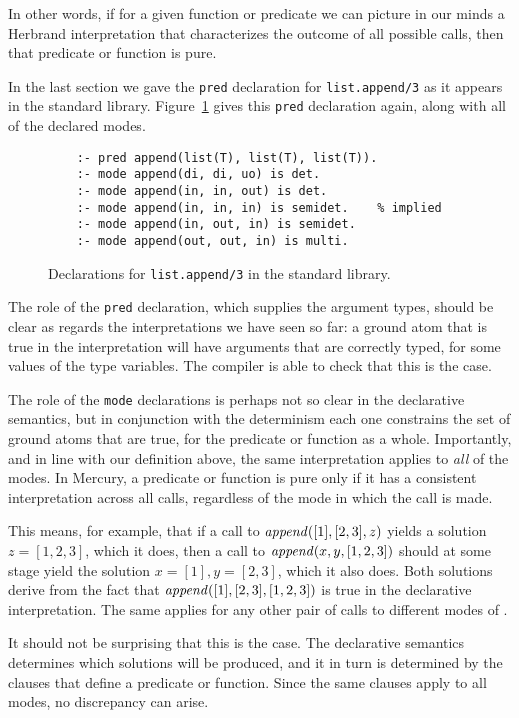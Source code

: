 \noindent
In other words,
if for a given function or predicate
we can picture in our minds a Herbrand interpretation
that characterizes the outcome of all possible calls,
then that predicate or function is pure.

In the last section we gave
the \texttt{pred} declaration for \texttt{list.append/3}
as it appears in the standard library.
Figure~\ref{fig:append-decls} gives this \texttt{pred} declaration again,
along with all of the declared modes.

\begin{figure}
\begin{verbatim}
    :- pred append(list(T), list(T), list(T)).
    :- mode append(di, di, uo) is det.
    :- mode append(in, in, out) is det.
    :- mode append(in, in, in) is semidet.    % implied
    :- mode append(in, out, in) is semidet.
    :- mode append(out, out, in) is multi.
\end{verbatim}
\caption{Declarations for \texttt{list.append/3} in the standard library.
\label{fig:append-decls}}
\end{figure}

The role of the \texttt{pred} declaration,
which supplies the argument types,
should be clear as regards the interpretations we have seen so far:
a ground atom that is true in the interpretation
will have arguments that are correctly typed,
for some values of the type variables.
The compiler is able to check that this is the case.

The role of the \texttt{mode} declarations
is perhaps not so clear in the declarative semantics,
but in conjunction with the determinism
each one constrains the set of ground atoms that are true,
for the predicate or function as a whole.
Importantly,
and in line with our definition above,
the same interpretation applies to \emph{all} of the modes.
In Mercury, a predicate or function is pure
only if it has a consistent interpretation across all calls,
regardless of the mode in which the call is made.

This means, for example,
that if a call to $\text{\textit{append}}([1],[2,3],z)$
yields a solution $z = [1,2,3]$,
which it does,
then a call to $\text{\textit{append}}(x,y,[1,2,3])$
should at some stage yield the solution $x = [1], y = [2,3]$,
which it also does.
Both solutions derive from the fact that
$\text{\textit{append}}([1],[2,3],[1,2,3])$ is true
in the declarative interpretation.
The same applies for any other pair of calls
to different modes of .

It should not be surprising that this is the case.
The declarative semantics determines
which solutions will be produced,
and it in turn is determined by
the clauses that define a predicate or function.
Since the same clauses apply to all modes,
no discrepancy can arise.


